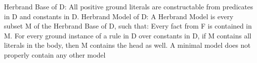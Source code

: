 \begin{exercise}{0}
  \begin{subexercise}
    Herbrand Base of D: All positive ground literals are constructable from predicates in D and constants in D.
    Herbrand Model of D: A Herbrand Model is every subset M of the Herbrand Base of D, such that: Every fact from F is contained in M. For every ground instance of a rule in D over constants in D, if M contains all literals in the body, then M contains the head as well. A minimal model does not properly contain any other model 
  \end{subexercise}

\end{exercise}

